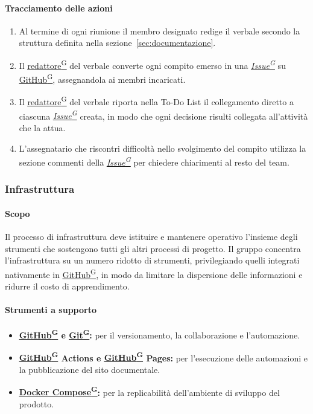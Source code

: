 \documentclass[a4paper,12pt]{article}
\providecommand{\glslink}[2]{\href{https://alittlebyte-19.github.io/Documentazione/glossario.html\#gls-#1}{\underline{#2}\textsuperscript{\scriptsize G}}}
\begin{document}
\paragraph{Tracciamento delle azioni}
\begin{enumerate}
    \item Al termine di ogni riunione il membro designato redige il verbale secondo la struttura definita nella sezione~\ref{sec:documentazione}.
    \item Il \glslink{redattore}{redattore} del verbale converte ogni compito emerso in una \textit{\glslink{issue}{Issue}} su \glslink{github}{GitHub}, assegnandola ai membri incaricati.
    \item Il \glslink{redattore}{redattore} del verbale riporta nella To-Do List il collegamento diretto a ciascuna \textit{\glslink{issue}{Issue}} creata, in modo che ogni decisione risulti collegata all'attività che la attua.
    \item L'assegnatario che riscontri difficoltà nello svolgimento del compito utilizza la sezione commenti della \textit{\glslink{issue}{Issue}} per chiedere chiarimenti al resto del team.
\end{enumerate}

\subsubsection{Infrastruttura}

\paragraph{Scopo}
Il processo di infrastruttura deve istituire e mantenere operativo l'insieme degli strumenti che sostengono tutti gli altri processi di progetto. Il gruppo concentra l'infrastruttura su un numero ridotto di strumenti, privilegiando quelli integrati nativamente in \glslink{github}{GitHub}, in modo da limitare la dispersione delle informazioni e ridurre il costo di apprendimento.

\paragraph{Strumenti a supporto}
\begin{itemize}
    \item \textbf{\glslink{github}{GitHub} e \glslink{git}{Git}:} per il versionamento, la collaborazione e l'automazione.
    \item \textbf{\glslink{github}{GitHub} Actions e \glslink{github}{GitHub} Pages:} per l'esecuzione delle automazioni e la pubblicazione del sito documentale.
    \item \textbf{\glslink{docker-compose}{Docker Compose}:} per la replicabilità dell'ambiente di sviluppo del prodotto.
\end{itemize}
\end{document}
